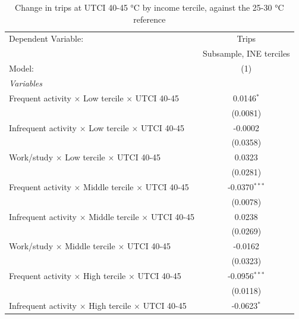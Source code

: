
\begin{table}[htbp]
   \caption{\label{table_model_d_40-45} Change in trips at UTCI 40-45 °C by income tercile, against the 25-30 °C reference}
   \centering
   \small
   \begin{tabular}{lc}
      \tabularnewline \midrule \midrule
      Dependent Variable:                                               & Trips\\  
                                                                        & Subsample, INE terciles \\   
      Model:                                                            & (1)\\  
      \midrule
      \emph{Variables}\\
      Frequent activity $\times$ Low tercile $\times$ UTCI 40-45        & 0.0146$^{*}$\\   
                                                                        & (0.0081)\\   
      Infrequent activity $\times$ Low tercile $\times$ UTCI 40-45      & -0.0002\\   
                                                                        & (0.0358)\\   
      Work/study $\times$ Low tercile $\times$ UTCI 40-45               & 0.0323\\   
                                                                        & (0.0281)\\   
      Frequent activity $\times$ Middle tercile $\times$ UTCI 40-45     & -0.0370$^{***}$\\   
                                                                        & (0.0078)\\   
      Infrequent activity $\times$ Middle tercile $\times$ UTCI 40-45   & 0.0238\\   
                                                                        & (0.0269)\\   
      Work/study $\times$ Middle tercile $\times$ UTCI 40-45            & -0.0162\\   
                                                                        & (0.0323)\\   
      Frequent activity $\times$ High tercile $\times$ UTCI 40-45       & -0.0956$^{***}$\\   
                                                                        & (0.0118)\\   
      Infrequent activity $\times$ High tercile $\times$ UTCI 40-45     & -0.0623$^{*}$\\   

\end{tabular}
\end{table}

